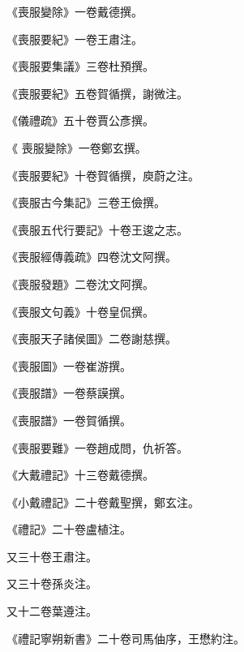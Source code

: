 \begin{pinyinscope}
 《喪服變除》一卷戴德撰。



 《喪服要紀》一卷王肅注。



 《喪服要集議》三卷杜預撰。



 《喪服要紀》五卷賀循撰，謝微注。



 《儀禮疏》五十卷賈公彥撰。



 《
 喪服變除》一卷鄭玄撰。



 《喪服要紀》十卷賀循撰，庾蔚之注。



 《喪服古今集記》三卷王儉撰。



 《喪服五代行要記》十卷王逡之志。



 《喪服經傳義疏》四卷沈文阿撰。



 《喪服發題》二卷沈文阿撰。



 《喪服文句義》十卷皇侃撰。



 《喪服天子諸侯圖》二卷謝慈撰。



 《喪服圖》一卷崔游撰。



 《喪服譜》一卷蔡謨撰。



 《喪服譜》一卷賀循撰。



 《喪服要難》一卷趙成問，仇祈答。



 《大戴禮記》十三卷戴德撰。



 《小戴禮記》二十卷戴聖撰，鄭玄注。



 《禮記》二十卷盧植注。



 又三十卷王肅注。



 又三十卷孫炎注。



 又十二卷葉遵注。



 《禮記寧朔新書》二十卷司馬伷序，王懋約注。




\end{pinyinscope}
